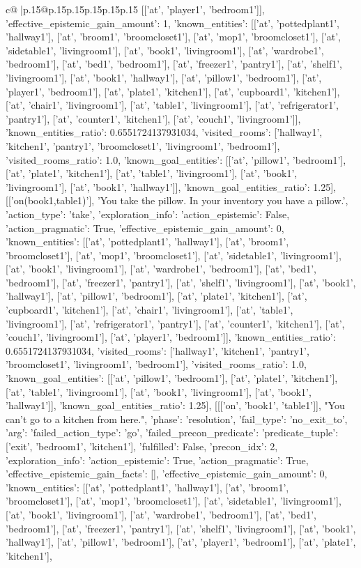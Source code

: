 \documentclass{article}
\begin{document}
{\begin{supertabular}{c@{$\;$}|p{.15\linewidth}@{}p{.15\linewidth}p{.15\linewidth}p{.15\linewidth}p{.15\linewidth}p{.15\linewidth}}
{{{[['at', 'player1', 'bedroom1']], 'effective_epistemic_gain_amount': 1, 'known_entities': [['at', 'pottedplant1', 'hallway1'], ['at', 'broom1', 'broomcloset1'], ['at', 'mop1', 'broomcloset1'], ['at', 'sidetable1', 'livingroom1'], ['at', 'book1', 'livingroom1'], ['at', 'wardrobe1', 'bedroom1'], ['at', 'bed1', 'bedroom1'], ['at', 'freezer1', 'pantry1'], ['at', 'shelf1', 'livingroom1'], ['at', 'book1', 'hallway1'], ['at', 'pillow1', 'bedroom1'], ['at', 'player1', 'bedroom1'], ['at', 'plate1', 'kitchen1'], ['at', 'cupboard1', 'kitchen1'], ['at', 'chair1', 'livingroom1'], ['at', 'table1', 'livingroom1'], ['at', 'refrigerator1', 'pantry1'], ['at', 'counter1', 'kitchen1'], ['at', 'couch1', 'livingroom1']], 'known_entities_ratio': 0.6551724137931034, 'visited_rooms': ['hallway1', 'kitchen1', 'pantry1', 'broomcloset1', 'livingroom1', 'bedroom1'], 'visited_rooms_ratio': 1.0, 'known_goal_entities': [['at', 'pillow1', 'bedroom1'], ['at', 'plate1', 'kitchen1'], ['at', 'table1', 'livingroom1'], ['at', 'book1', 'livingroom1'], ['at', 'book1', 'hallway1']], 'known_goal_entities_ratio': 1.25}}], [['on(book1,table1)'], 'You take the pillow. In your inventory you have a pillow.', {'action_type': 'take', 'exploration_info': {'action_epistemic': False, 'action_pragmatic': True, 'effective_epistemic_gain_amount': 0, 'known_entities': [['at', 'pottedplant1', 'hallway1'], ['at', 'broom1', 'broomcloset1'], ['at', 'mop1', 'broomcloset1'], ['at', 'sidetable1', 'livingroom1'], ['at', 'book1', 'livingroom1'], ['at', 'wardrobe1', 'bedroom1'], ['at', 'bed1', 'bedroom1'], ['at', 'freezer1', 'pantry1'], ['at', 'shelf1', 'livingroom1'], ['at', 'book1', 'hallway1'], ['at', 'pillow1', 'bedroom1'], ['at', 'plate1', 'kitchen1'], ['at', 'cupboard1', 'kitchen1'], ['at', 'chair1', 'livingroom1'], ['at', 'table1', 'livingroom1'], ['at', 'refrigerator1', 'pantry1'], ['at', 'counter1', 'kitchen1'], ['at', 'couch1', 'livingroom1'], ['at', 'player1', 'bedroom1']], 'known_entities_ratio': 0.6551724137931034, 'visited_rooms': ['hallway1', 'kitchen1', 'pantry1', 'broomcloset1', 'livingroom1', 'bedroom1'], 'visited_rooms_ratio': 1.0, 'known_goal_entities': [['at', 'pillow1', 'bedroom1'], ['at', 'plate1', 'kitchen1'], ['at', 'table1', 'livingroom1'], ['at', 'book1', 'livingroom1'], ['at', 'book1', 'hallway1']], 'known_goal_entities_ratio': 1.25}}], [[['on', 'book1', 'table1']], "You can't go to a kitchen from here.", {'phase': 'resolution', 'fail_type': 'no_exit_to', 'arg': {'failed_action_type': 'go', 'failed_precon_predicate': {'predicate_tuple': ['exit', 'bedroom1', 'kitchen1'], 'fulfilled': False, 'precon_idx': 2}}, 'exploration_info': {'action_epistemic': True, 'action_pragmatic': True, 'effective_epistemic_gain_facts': [], 'effective_epistemic_gain_amount': 0, 'known_entities': [['at', 'pottedplant1', 'hallway1'], ['at', 'broom1', 'broomcloset1'], ['at', 'mop1', 'broomcloset1'], ['at', 'sidetable1', 'livingroom1'], ['at', 'book1', 'livingroom1'], ['at', 'wardrobe1', 'bedroom1'], ['at', 'bed1', 'bedroom1'], ['at', 'freezer1', 'pantry1'], ['at', 'shelf1', 'livingroom1'], ['at', 'book1', 'hallway1'], ['at', 'pillow1', 'bedroom1'], ['at', 'player1', 'bedroom1'], ['at', 'plate1', 'kitchen1'], }}}
\end{supertabular}}
\end{document}
